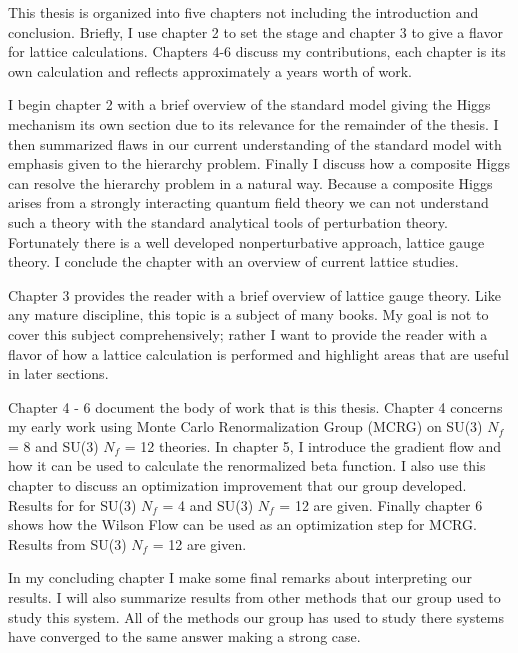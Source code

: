 This thesis is organized into five chapters not including the introduction and conclusion.
Briefly, I use chapter 2 to set the stage and chapter 3 to give a flavor for lattice calculations.
Chapters 4-6 discuss my contributions, each chapter is its own calculation and reflects approximately a years worth of work.

I begin chapter 2 with a brief overview of the standard model giving the Higgs mechanism its own section due to its relevance for the remainder of the thesis.
I then summarized flaws in our current understanding of the standard model with emphasis given to the hierarchy problem.
Finally I discuss how a composite Higgs can resolve the hierarchy problem in a natural way.
Because a composite Higgs arises from a strongly interacting quantum field theory we can not understand such a theory with the standard analytical tools of perturbation theory.
Fortunately there is a well developed nonperturbative approach, lattice gauge theory.
I conclude the chapter with an overview of current lattice studies.

Chapter 3 provides the reader with a brief overview of lattice gauge theory.  
Like any mature discipline, this topic is a subject of many books.
My goal is not to cover this subject comprehensively; rather I want to provide the reader with a flavor of how a lattice calculation is performed and highlight areas that are useful in later sections.

Chapter 4 - 6 document the body of work that is this thesis.
Chapter 4 concerns my early work using Monte Carlo Renormalization Group (MCRG) on SU(3) $N_f$ = 8 and SU(3) $N_f$ = 12 theories.
In chapter 5, I introduce the gradient flow and how it can be used to calculate the renormalized beta function.
I also use this chapter to discuss an optimization improvement that our group developed.
Results for for SU(3) $N_f$ = 4 and SU(3) $N_f$ = 12 are given.
Finally chapter 6 shows how the Wilson Flow can be used as an optimization step for MCRG.
Results from SU(3) $N_f$ = 12 are given.

In my concluding chapter I make some final remarks about interpreting our results.
I will also summarize results from other methods that our group used to study this system.
All of the methods our group has used to study there systems have converged to the same answer making a strong case.
